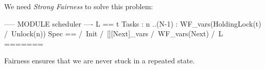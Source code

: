 We need \textit{Strong Fairness} to solve this problem:
\begin{tla}
----- MODULE scheduler ---- 
L ==
    \A t \in Tasks :
        \A n ..(N-1) :
            WF_vars(HoldingLock(t) /\ Unlock(n))
Spec ==
  /\ Init
  /\ [][Next]_vars
  /\ WF_vars(Next)
  /\ L 
======= 
\end{tla}
\begin{tlatex}
\@x{}\moduleLeftDash{}\moduleRightDash\@xx{}%
%
%
%
%
%
%
%
%
%
\@x{}\bottombar\@xx{}%
\end{tlatex}
\newline

Fairness ensures that we are never stuck in a repeated state.

% 
